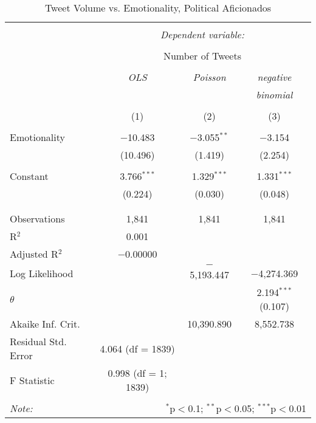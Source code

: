 \begin{table}[!htbp] \centering 
  \caption{Tweet Volume vs. Emotionality, Political Aficionados} 
  \label{} 
    \begin{tabular}{@{\extracolsep{5pt}}lccc} 
    \\[-1.8ex]\hline 
    \hline \\[-1.8ex] 
     & \multicolumn{3}{c}{\textit{Dependent variable:}} \\ 
    \cline{2-4} 
    \\[-1.8ex] & \multicolumn{3}{c}{Number of Tweets} \\ 
    \\[-1.8ex] & \textit{OLS} & \textit{Poisson} & \textit{negative} \\ 
     & \textit{} & \textit{} & \textit{binomial} \\ 
    \\[-1.8ex] & (1) & (2) & (3)\\ 
    \hline \\[-1.8ex] 
     Emotionality & $-$10.483 & $-$3.055$^{**}$ & $-$3.154 \\ 
      & (10.496) & (1.419) & (2.254) \\ 
      & & & \\ 
     Constant & 3.766$^{***}$ & 1.329$^{***}$ & 1.331$^{***}$ \\ 
      & (0.224) & (0.030) & (0.048) \\ 
      & & & \\ 
    \hline \\[-1.8ex] 
    Observations & 1,841 & 1,841 & 1,841 \\ 
    R$^{2}$ & 0.001 &  &  \\ 
    Adjusted R$^{2}$ & $-$0.00000 &  &  \\ 
    Log Likelihood &  & $-$5,193.447 & $-$4,274.369 \\ 
    $\theta$ &  &  & 2.194$^{***}$  (0.107) \\ 
    Akaike Inf. Crit. &  & 10,390.890 & 8,552.738 \\ 
    Residual Std. Error & 4.064 (df = 1839) &  &  \\ 
    F Statistic & 0.998 (df = 1; 1839) &  &  \\ 
    \hline 
    \hline \\[-1.8ex] 
    \textit{Note:}  & \multicolumn{3}{r}{$^{*}$p$<$0.1; $^{**}$p$<$0.05; $^{***}$p$<$0.01} \\ 
    \end{tabular} 
\end{table} 

